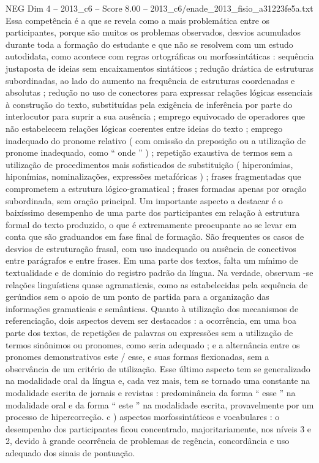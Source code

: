 \begin{textsample}{NEG Dim 4 – 2013\_c6 – Score 8.00 – 2013\_c6/enade\_2013\_fisio\_a31223fe5a.txt}
Essa competência é a que se revela como a mais problemática entre os participantes, porque são muitos os problemas observados, desvios acumulados durante toda a formação do estudante e que não se resolvem com um estudo autodidata, como acontece com regras ortográficas ou morfossintáticas : sequência justaposta de ideias sem encaixamentos sintáticos ; redução drástica de estruturas subordinadas, ao lado do aumento na frequência de estruturas coordenadas e absolutas ; redução no uso de conectores para expressar relações lógicas essenciais à construção do texto, substituídas pela exigência de inferência por parte do interlocutor para suprir a sua ausência ; emprego equivocado de operadores que não estabelecem relações lógicas coerentes entre ideias do texto ; emprego inadequado do pronome relativo ( com omissão da preposição ou a utilização de pronome inadequado, como “ onde ” ) ; repetição exaustiva de termos sem a utilização de procedimentos mais sofisticados de substituição ( hiperonímias, hiponímias, nominalizações, expressões metafóricas ) ; frases fragmentadas que comprometem a estrutura lógico-gramatical ; frases formadas apenas por oração subordinada, sem oração principal.
Um importante aspecto a destacar é o baixíssimo desempenho de uma parte dos participantes em relação à estrutura formal do texto produzido, o que é extremamente preocupante ao se levar em conta que são graduandos em fase final de formação.
São frequentes os casos de desvios de estruturação frasal, com uso inadequado ou ausência de conectivos entre parágrafos e entre frases.
Em uma parte dos textos, falta um mínimo de textualidade e de domínio do registro padrão da língua.
Na verdade, observam -se relações linguísticas quase agramaticais, como as estabelecidas pela sequência de gerúndios sem o apoio de um ponto de partida para a organização das informações gramaticais e semânticas.
Quanto à utilização dos mecanismos de referenciação, dois aspectos devem ser destacados : a ocorrência, em uma boa parte dos textos, de repetições de palavras ou expressões sem a utilização de termos sinônimos ou pronomes, como seria adequado ; e a alternância entre os pronomes demonstrativos este / esse, e suas formas flexionadas, sem a observância de um critério de utilização.
Esse último aspecto tem se generalizado na modalidade oral da língua e, cada vez mais, tem se tornado uma constante na modalidade escrita de jornais e revistas : predominância da forma “ esse ” na modalidade oral e da forma “ este ” na modalidade escrita, provavelmente por um processo de hipercorreção. c ) aspectos morfossintáticos e vocabulares : o desempenho dos participantes ficou concentrado, majoritariamente, nos níveis 3 e 2, devido à grande ocorrência de problemas de regência, concordância e uso adequado dos sinais de pontuação.

\end{textsample}
